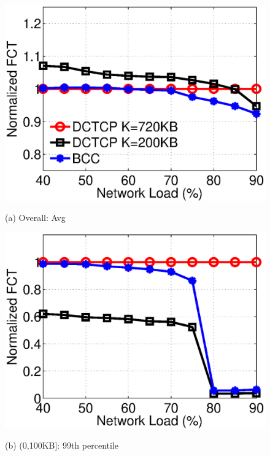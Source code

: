 \begin{figure}[t]
\centering
\begin{minipage}{0.245\linewidth}
   \includegraphics[width=1\linewidth]{figs/websearch_overall_avg_fct.eps}
   \centerline{(a) Overall: Avg}
\end{minipage}
\begin{minipage}{0.245\linewidth}
   \includegraphics[width=1\linewidth]{figs/websearch_small_tail_fct.eps}
   \centerline{(b) (0,100KB]: 99th percentile}
\end{minipage}
\begin{minipage}{0.245\linewidth}

\end{minipage}
\end{figure}
